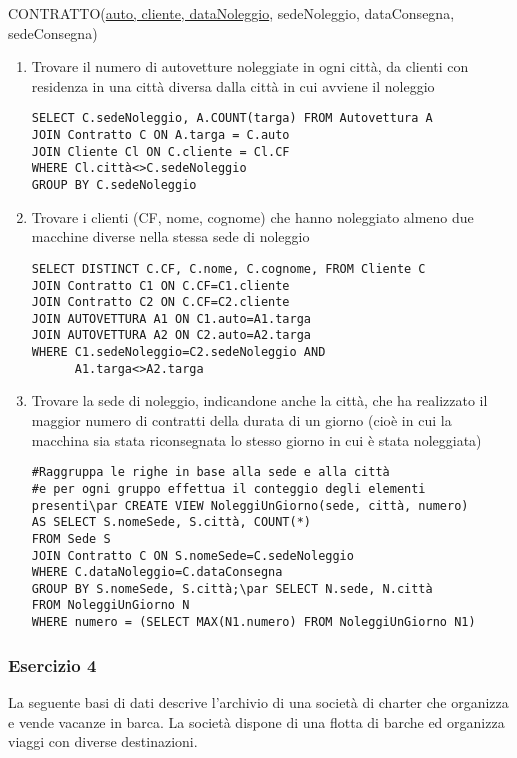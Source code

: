 \documentclass[a4paper]{article}
\begin{document}
CONTRATTO(\underline{auto, cliente, dataNoleggio}, sedeNoleggio, dataConsegna, sedeConsegna)\par \begin{enumerate}
\item Trovare il numero di autovetture noleggiate in ogni città, da clienti con residenza in una città diversa dalla città in cui avviene il noleggio
\begin{verbatim}
SELECT C.sedeNoleggio, A.COUNT(targa) FROM Autovettura A
JOIN Contratto C ON A.targa = C.auto
JOIN Cliente Cl ON C.cliente = Cl.CF
WHERE Cl.città<>C.sedeNoleggio
GROUP BY C.sedeNoleggio
\end{verbatim}
\item Trovare i clienti (CF, nome, cognome) che hanno noleggiato almeno due macchine diverse nella stessa sede di noleggio
\begin{verbatim}
SELECT DISTINCT C.CF, C.nome, C.cognome, FROM Cliente C
JOIN Contratto C1 ON C.CF=C1.cliente
JOIN Contratto C2 ON C.CF=C2.cliente
JOIN AUTOVETTURA A1 ON C1.auto=A1.targa
JOIN AUTOVETTURA A2 ON C2.auto=A2.targa
WHERE C1.sedeNoleggio=C2.sedeNoleggio AND
      A1.targa<>A2.targa
\end{verbatim}
\item Trovare la sede di noleggio, indicandone anche la città, che ha realizzato il maggior numero di contratti della durata di un giorno (cioè in cui la macchina sia stata riconsegnata lo stesso giorno in cui è stata noleggiata)
\begin{verbatim}
#Raggruppa le righe in base alla sede e alla città
#e per ogni gruppo effettua il conteggio degli elementi presenti\par CREATE VIEW NoleggiUnGiorno(sede, città, numero)
AS SELECT S.nomeSede, S.città, COUNT(*)
FROM Sede S
JOIN Contratto C ON S.nomeSede=C.sedeNoleggio
WHERE C.dataNoleggio=C.dataConsegna
GROUP BY S.nomeSede, S.città;\par SELECT N.sede, N.città
FROM NoleggiUnGiorno N
WHERE numero = (SELECT MAX(N1.numero) FROM NoleggiUnGiorno N1)
\end{verbatim}
\end{enumerate}\par \subsubsection{Esercizio 4}
La seguente basi di dati descrive l'archivio di una società di charter che organizza e vende vacanze in barca. La società dispone di una flotta di barche ed organizza viaggi con diverse destinazioni.\medskip\\
\end{document}
